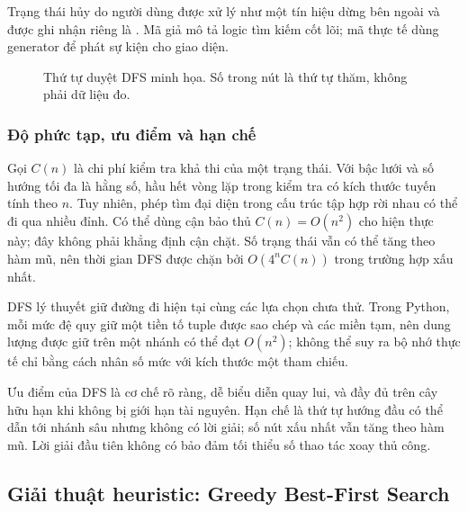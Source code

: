 Trạng thái hủy do người dùng được xử lý như một tín hiệu dừng bên ngoài và
được ghi nhận riêng là . Mã giả mô tả logic tìm kiếm cốt lõi;
mã thực tế dùng generator để phát sự kiện cho giao diện.

\begin{figure}[H]\centering
{}
\caption{Thứ tự duyệt DFS minh họa. Số trong nút là thứ tự thăm, không phải dữ liệu đo.}
\end{figure}

\subsubsection{Độ phức tạp, ưu điểm và hạn chế}

Gọi $C(n)$ là chi phí kiểm tra khả thi của một trạng thái. Với bậc lưới và số
hướng tối đa là hằng số, hầu hết vòng lặp trong kiểm tra có kích thước tuyến
tính theo $n$. Tuy nhiên, phép tìm đại diện trong cấu trúc tập hợp rời nhau có
thể đi qua nhiều đỉnh. Có thể dùng cận bảo thủ $C(n)=O(n^2)$ cho hiện thực này;
đây không phải khẳng định cận chặt. Số trạng thái vẫn có thể tăng theo hàm mũ,
nên thời gian DFS được chặn bởi $O(4^n C(n))$ trong trường hợp xấu nhất.

DFS lý thuyết giữ đường đi hiện tại cùng các lựa chọn chưa thử. Trong Python,
mỗi mức đệ quy giữ một tiền tố tuple được sao chép và các miền tạm, nên dung
lượng được giữ trên một nhánh có thể đạt $O(n^2)$; không thể suy ra bộ nhớ
thực tế chỉ bằng cách nhân số mức với kích thước một tham chiếu.

Ưu điểm của DFS là cơ chế rõ ràng, dễ biểu diễn quay lui, và đầy đủ trên cây
hữu hạn khi không bị giới hạn tài nguyên. Hạn chế là thứ tự hướng đầu có thể
dẫn tới nhánh sâu nhưng không có lời giải; số nút xấu nhất vẫn tăng theo hàm
mũ. Lời giải đầu tiên không có bảo đảm tối thiểu số thao tác xoay thủ công.

\subsection{Giải thuật heuristic: Greedy Best-First Search}
